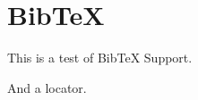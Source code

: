 
\def\mytitle{MultiMarkdown BibTeX Test}
\def\bibliocommand{}


\part{BibTeX}
\label{bibtex}

This is a test of BibTeX Support.~\citep{Knuth:1968}

And a locator.~\citep[p. 123]{Knuth:1981}




